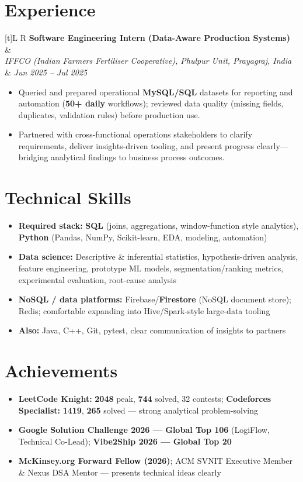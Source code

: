 \documentclass[a4paper,10pt]{article}
\newcommand{\resumeSubheading}[4]{%
  \vspace{0.35mm}
  \noindent
  \begin{tabularx}{\textwidth}[t]{L R}
    \textbf{#1} & #4 \\
    \textit{#3} & \textit{#2} \\
  \end{tabularx}
  \vspace{-0.35mm}%
}
\begin{document}
\section{Experience}
\small
\resumeSubheading
  {Software Engineering Intern (Data-Aware Production Systems)}{Jun 2025 -- Jul 2025}
  {IFFCO (Indian Farmers Fertiliser Cooperative), Phulpur Unit, Prayagraj, India}{}
\begin{itemize}
  \item Queried and prepared operational \textbf{MySQL/SQL} datasets for reporting and automation (\textbf{50+ daily} workflows); reviewed data quality (missing fields, duplicates, validation rules) before production use.
  \item Partnered with cross-functional operations stakeholders to clarify requirements, deliver insights-driven tooling, and present progress clearly---bridging analytical findings to business process outcomes.
\end{itemize}

\section{Technical Skills}
\small
\begin{itemize}[label={}]
  \item \textbf{Required stack:} \textbf{SQL} (joins, aggregations, window-function style analytics), \textbf{Python} (Pandas, NumPy, Scikit-learn, EDA, modeling, automation)
  \item \textbf{Data science:} Descriptive \& inferential statistics, hypothesis-driven analysis, feature engineering, prototype ML models, segmentation/ranking metrics, experimental evaluation, root-cause analysis
  \item \textbf{NoSQL / data platforms:} Firebase/\textbf{Firestore} (NoSQL document store); Redis; comfortable expanding into Hive/Spark-style large-data tooling
  \item \textbf{Also:} Java, C++, Git, pytest, clear communication of insights to partners
\end{itemize}

\section{Achievements}
\small
\begin{itemize}
  \item \textbf{LeetCode Knight:} \textbf{2048} peak, \textbf{744} solved, 32 contests; \textbf{Codeforces Specialist:} \textbf{1419}, \textbf{265} solved --- strong analytical problem-solving
  \item \textbf{Google Solution Challenge 2026 --- Global Top 106} (LogiFlow, Technical Co-Lead); \textbf{Vibe2Ship 2026 --- Global Top 20}
  \item \textbf{McKinsey.org Forward Fellow (2026)}; ACM SVNIT Executive Member \& Nexus DSA Mentor --- presents technical ideas clearly
\end{itemize}
\end{document}
